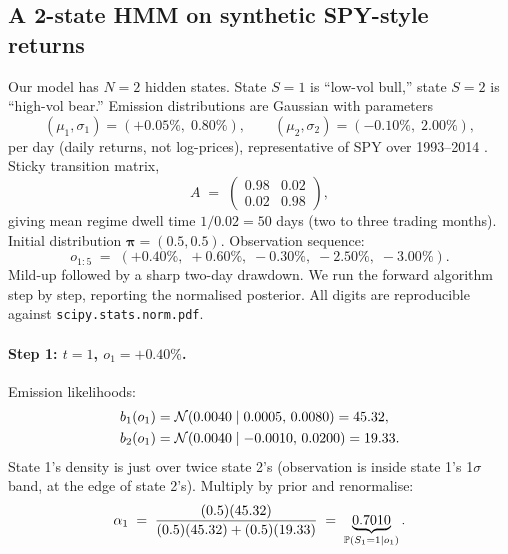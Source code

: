 \subsection{A 2-state HMM on synthetic SPY-style returns}
\label{subsec:wsw_hmm_worked}

Our model has $N = 2$ hidden states. State $S = 1$ is ``low-vol
bull,'' state $S = 2$ is ``high-vol bear.'' Emission distributions
are Gaussian with parameters
\begin{equation}
  (\mu_1, \sigma_1) = (+0.05\%,\; 0.80\%),
  \qquad
  (\mu_2, \sigma_2) = (-0.10\%,\; 2.00\%),
  \label{eq:wsw_hmm_emissions}
\end{equation}
per day (daily returns, not log-prices), representative of SPY
over 1993--2014 \citep{quantstart2016hmm}. Sticky transition
matrix,
\begin{equation}
  A \;=\;
  \begin{pmatrix}
    0.98 & 0.02 \\
    0.02 & 0.98
  \end{pmatrix},
  \label{eq:wsw_hmm_A}
\end{equation}
giving mean regime dwell time $1/0.02 = 50$ days (two to three
trading months). Initial distribution $\boldsymbol{\pi} = (0.5,
0.5)$. Observation sequence:
\begin{equation}
  o_{1:5} \;=\; (+0.40\%,\; +0.60\%,\; -0.30\%,\; -2.50\%,\; -3.00\%).
  \label{eq:wsw_hmm_obs}
\end{equation}
Mild-up followed by a sharp two-day drawdown. We run the forward
algorithm step by step, reporting the normalised posterior. All
digits are reproducible against \texttt{scipy.stats.norm.pdf}.

\paragraph{Step 1: $t = 1$, $o_1 = +0.40\%$.} Emission likelihoods:
\begin{align}
  b_1(o_1)
  &= \mathcal{N}(0.0040 \mid 0.0005,\, 0.0080)
  = 45.32, \\
  b_2(o_1)
  &= \mathcal{N}(0.0040 \mid -0.0010,\, 0.0200)
  = 19.33.
\end{align}
State 1's density is just over twice state 2's (observation is
inside state 1's 1$\sigma$ band, at the edge of state 2's).
Multiply by prior and renormalise:
\begin{equation}
  \alpha_1 \;=\;
  \frac{(0.5)(45.32)}{(0.5)(45.32) + (0.5)(19.33)}
  \;=\;
  \underbrace{0.7010}_{\mathbb{P}(S_1 = 1 \mid o_1)}.
  \label{eq:wsw_hmm_alpha1}
\end{equation}

